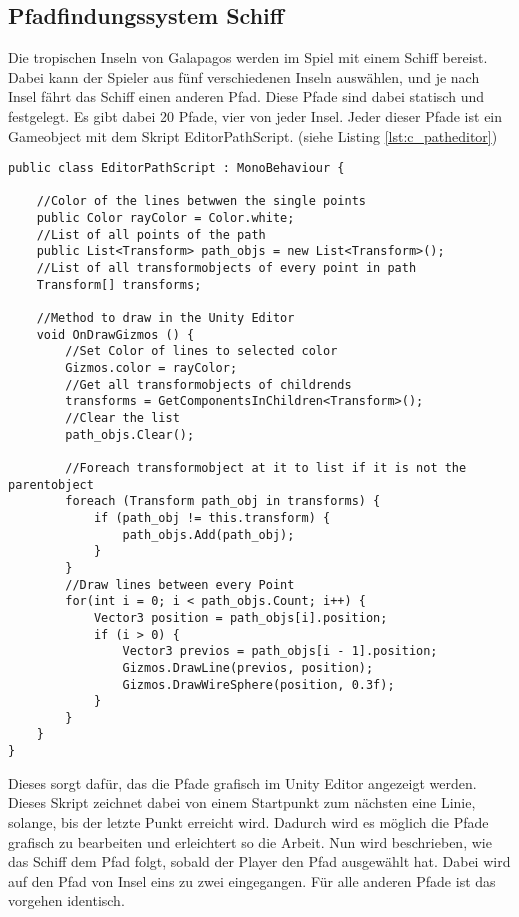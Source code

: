 \subsection{Pfadfindungssystem Schiff}
Die tropischen Inseln von Galapagos werden im Spiel mit einem Schiff bereist. Dabei kann der Spieler aus fünf verschiedenen Inseln auswählen, und je nach Insel fährt das Schiff einen anderen Pfad. Diese Pfade sind dabei statisch und festgelegt. Es gibt dabei 20 Pfade, vier von jeder Insel. Jeder dieser Pfade ist ein Gameobject mit dem Skript EditorPathScript. (siehe Listing \ref{lst:c_patheditor})

\begin{scriptsize}
\lstset{
	float,
	caption=Skript EditorPathScript.cs, 
	language=[Sharp]C, 
	frame=single,  
	showstringspaces=false, 
	showspaces=false, 
	numbers=left, 
	captionpos=b, 
	belowcaptionskip=4pt,
	basicstyle=\ttfamily
} 
\newpage
\begin{lstlisting}[label=lst:c_patheditor]
public class EditorPathScript : MonoBehaviour {

    //Color of the lines betwwen the single points
    public Color rayColor = Color.white;
    //List of all points of the path
    public List<Transform> path_objs = new List<Transform>();
    //List of all transformobjects of every point in path
    Transform[] transforms;

    //Method to draw in the Unity Editor
    void OnDrawGizmos () {
        //Set Color of lines to selected color
        Gizmos.color = rayColor;
        //Get all transformobjects of childrends
        transforms = GetComponentsInChildren<Transform>();
        //Clear the list
        path_objs.Clear();

        //Foreach transformobject at it to list if it is not the parentobject
        foreach (Transform path_obj in transforms) {
            if (path_obj != this.transform) {
                path_objs.Add(path_obj);
            }
        }
        //Draw lines between every Point
        for(int i = 0; i < path_objs.Count; i++) {
            Vector3 position = path_objs[i].position;
            if (i > 0) {
                Vector3 previos = path_objs[i - 1].position;
                Gizmos.DrawLine(previos, position);
                Gizmos.DrawWireSphere(position, 0.3f);
            }
        }
    }
}

\end{lstlisting}
\end{scriptsize}

Dieses sorgt dafür, das die Pfade grafisch im Unity Editor angezeigt werden. Dieses Skript zeichnet dabei von einem Startpunkt zum nächsten eine Linie, solange, bis der letzte Punkt erreicht wird. Dadurch wird es möglich die Pfade grafisch zu bearbeiten und erleichtert so die Arbeit. 
Nun wird beschrieben, wie das Schiff dem Pfad folgt, sobald der Player den Pfad ausgewählt hat. Dabei wird auf den Pfad von Insel eins zu zwei eingegangen. Für alle anderen Pfade ist das vorgehen identisch.

